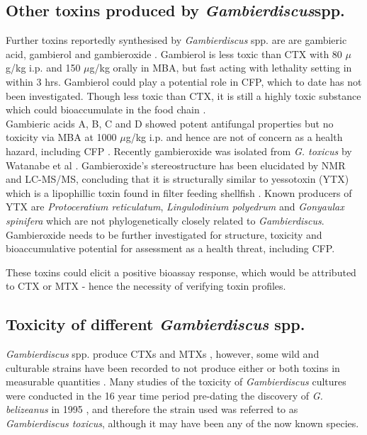 \documentclass[12pt]{article}
\begin{document}
\subsection{Other toxins produced by \emph{Gambierdiscus}spp.}
Further toxins reportedly synthesised by \emph{Gambierdiscus} spp. are are gambieric acid, gambierol and gambieroxide \cite{watanabe2013gambieroxide,satake1993gambierol,nagai1992gambieric}.
Gambierol is less toxic than CTX with 80 $\mu$g/kg i.p. and 150 $\mu$g/kg orally in MBA, but fast acting with lethality setting in within 3 hrs\cite{ito2003pathological}. Gambierol could play a potential role in CFP, which to date has not been investigated. Though less toxic than CTX, it is still a highly toxic substance which could bioaccumulate in the food chain \cite{rhodes2014production}.\\
Gambieric acids A, B, C and D showed potent antifungal properties but no toxicity via MBA at 1000 $\mu$g/kg i.p. and hence are not of concern as a health hazard, including CFP \cite{rhodes2014production,nagai1992gambieric}.
Recently gambieroxide was isolated from \emph{G. toxicus} by Watanabe et al \cite{watanabe2013gambieroxide}. Gambieroxide's stereostructure has been elucidated by NMR and LC-MS/MS, concluding that it is structurally similar to yessotoxin (YTX) which is a lipophillic toxin found in filter feeding shellfish  \cite{tubaro2010yessotoxins}. Known producers of YTX are \emph{Protoceratium reticulatum}, \emph{Lingulodinium polyedrum} and \emph{Gonyaulax spinifera} \cite{tubaro2010yessotoxins} which are not  phylogenetically closely related to \emph{Gambierdiscus}.  Gambieroxide needs to be further investigated for structure, toxicity and bioaccumulative potential for assessment as a health threat, including CFP. 

These toxins could elicit a positive bioassay response, which would be attributed to CTX or MTX - hence the necessity of verifying toxin profiles.\\

\subsection{Toxicity of different \emph{Gambierdiscus} spp.}
\emph{Gambierdiscus} spp. produce CTXs and MTXs \cite{murata1990structures,holmes1991strain,satake1993structure,holmes1994purification,satake1996isolation}, however, some wild and culturable strains have been recorded to not produce either or both toxins in measurable quantities \cite{gillespie1985significance,holmes1990toxicity}. Many studies of the toxicity of \emph{Gambierdiscus} cultures were conducted in the 16 year time period pre-dating the discovery of \emph{G. belizeanus} in 1995 \cite{faust1995observation}, and therefore the strain used was referred to as \emph{Gambierdiscus toxicus}, although it may have been any of the now known species. \\
\end{document}
